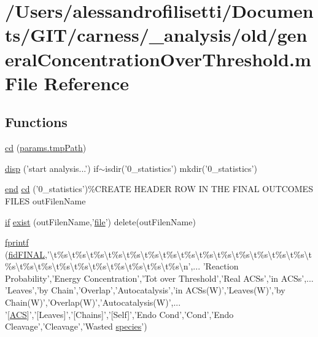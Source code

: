 \hypertarget{a00028}{\section{/\+Users/alessandrofilisetti/\+Documents/\+G\+I\+T/carness/\+\_\+analysis/old/general\+Concentration\+Over\+Threshold.m File Reference}
\label{a00028}
}
\subsection*{Functions}
\begin{DoxyCompactItemize}
\item 
\hyperlink{a00028_afb8c99b8f4d982428090b0b6ab07dafb}{cd} (\hyperlink{a00032_a1e5a4863ab2b87f923e1d19e2da1f5ac}{params.\+tmp\+Path})
\item 
\hyperlink{a00028_ae60321a34c0a93776384a837b8f3a9e1}{disp} ('start analysis...') if$\sim$isdir('0\+\_\+statistics') mkdir('0\+\_\+statistics')
\item 
\hyperlink{a00025_afb358f48b1646c750fb9da6c6585be2b}{end} \hyperlink{a00028_a442b9e123f36a16e7fca4f2f2f067c27}{cd} ('0\+\_\+statistics')\%\+C\+R\+E\+A\+T\+E H\+E\+A\+D\+E\+R R\+O\+W I\+N T\+H\+E F\+I\+N\+A\+L O\+U\+T\+C\+O\+M\+E\+S F\+I\+L\+E\+S out\+Filen\+Name
\item 
\hyperlink{a00030_a01d55766b8058903dd360b4bda71f9f5}{if} \hyperlink{a00028_a1e641c44546ec25e735b887393dceb16}{exist} (out\+Filen\+Name,'\hyperlink{a00110_a4e8353d6c62cf54bf4a1a8f63e56b8c3}{file}') delete(out\+Filen\+Name)
\item 
\hyperlink{a00028_a6ffb0f3cb73c8f8faf0b5192942de203}{fprintf} (\hyperlink{a00028_a2f1bf22f6a0c3f5791577061e92c0433}{fid\+F\+I\+N\+A\+L},'\textbackslash{}t\%s\textbackslash{}t\%s\textbackslash{}t\%s\textbackslash{}t\%s\textbackslash{}t\%s\textbackslash{}t\%s\textbackslash{}t\%s\textbackslash{}t\%s\textbackslash{}t\%s\textbackslash{}t\%s\textbackslash{}t\%s\textbackslash{}t\%s\textbackslash{}t\%s\textbackslash{}t\%s\textbackslash{}t\%s\textbackslash{}t\%s\textbackslash{}t\%s\textbackslash{}t\%s\textbackslash{}t\%s\textbackslash{}t\%s\textbackslash{}t\%s\textbackslash{}t\%s\textbackslash{}t\%s\textbackslash{}t\%s\textbackslash{}n',... 'Reaction Probability','Energy Concentration','Tot over Threshold','Real A\+C\+Ss','in A\+C\+Ss',... 'Leaves','by Chain','Overlap','Autocatalysis','in A\+C\+Ss(W)','Leaves(W)','by Chain(W)','Overlap(W)','Autocatalysis(W)',... '\mbox{[}\hyperlink{a00028_ad72e1068795c577213481e5db7f3e925}{A\+C\+S}\mbox{]}','\mbox{[}Leaves\mbox{]}','\mbox{[}Chains\mbox{]}','\mbox{[}Self\mbox{]}','Endo Cond','Cond','Endo Cleavage','Cleavage','Wasted \hyperlink{a00021}{species}')

\end{DoxyCompactItemize}
